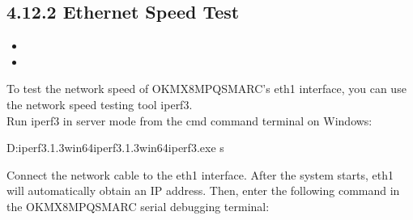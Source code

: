 \documentclass[letterpaper,10pt,openany,english]{sphinxmanual}
\begin{document}
\subsection{4.12.2 Ethernet Speed Test}
\label{\detokenize{linux-manual:ethernet-speed-test}}
\sphinxAtStartPar
{}
\begin{itemize}
\item {} 
\sphinxAtStartPar
{}

\item {} 
\sphinxAtStartPar
{}

\end{itemize}

\sphinxAtStartPar
To test the network speed of OK\sphinxhyphen{}MX8MPQ\sphinxhyphen{}SMARC’s eth1 interface, you can use the network speed testing tool iperf3.\\
Run iperf3 in server mode from the cmd command terminal on Windows:

\begin{sphinxVerbatim}[commandchars=\\\{\}]
D:\PYGZbs{}iperf\PYGZhy{}3.1.3\PYGZhy{}win64\PYGZbs{}iperf\PYGZhy{}3.1.3\PYGZhy{}win64\PYGZgt{}iperf3.exe \PYGZhy{}s
\end{sphinxVerbatim}

\sphinxAtStartPar
{}Connect the network cable to the eth1 interface. After the system starts, eth1 will automatically obtain an IP address. Then, enter the following command in the OK\sphinxhyphen{}MX8MPQ\sphinxhyphen{}SMARC serial debugging terminal:
\end{document}
